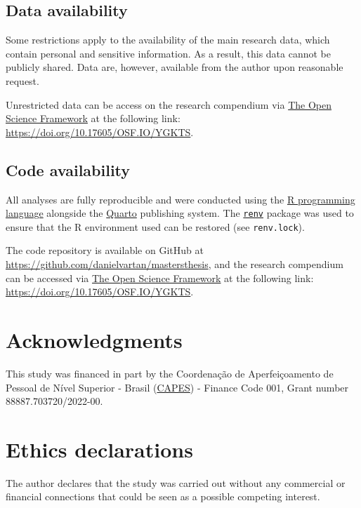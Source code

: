\documentclass[
12pt,
openright,
oneside,
a4paper,
chapter=TITLE,
section=TITLE,
french,
spanish,
brazil,
english
]{abntex2}
\begin{document}
\subsection{Data availability}\label{data-availability}

Some restrictions apply to the availability of the main research data,
which contain personal and sensitive information. As a result, this data
cannot be publicly shared. Data are, however, available from the author
upon reasonable request.

Unrestricted data can be access on the research compendium via
\href{https://osf.io/}{The Open Science Framework} at the following
link: \url{https://doi.org/10.17605/OSF.IO/YGKTS}.

\subsection{Code availability}\label{code-availability}

All analyses are fully reproducible and were conducted using the
\href{https://www.r-project.org/}{R programming language} alongside the
\href{https://quarto.org/}{Quarto} publishing system. The
\href{https://rstudio.github.io/renv/}{\texttt{renv}} package was used
to ensure that the R environment used can be restored (see
\texttt{renv.lock}).

The code repository is available on GitHub at
\url{https://github.com/danielvartan/mastersthesis}, and the research
compendium can be accessed via \href{https://osf.io/}{The Open Science
Framework} at the following link:
\url{https://doi.org/10.17605/OSF.IO/YGKTS}.

\section{Acknowledgments}\label{acknowledgments}

This study was financed in part by the Coordenação de Aperfeiçoamento de
Pessoal de Nível Superior - Brasil
(\href{https://www.gov.br/capes/}{CAPES}) - Finance Code 001, Grant
number 88887.703720/2022-00.

\section{Ethics declarations}\label{ethics-declarations}

The author declares that the study was carried out without any
commercial or financial connections that could be seen as a possible
competing interest.
\end{document}
